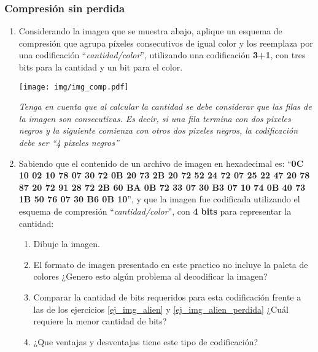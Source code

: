 \documentclass[12pt]{article}
\begin{document}
\subsubsection*{Compresión sin perdida}

\begin{enumerate}[resume]
    \item Considerando la imagen que se muestra abajo, aplique un esquema de
        compresión que agrupa píxeles consecutivos de igual color y los
        reemplaza por una codificación ``\emph{cantidad/color}'', utilizando
        una codificación \textbf{3+1}, con tres bits para la cantidad y un bit
        para el color.

        \texttt{[image: img/img\_comp.pdf]}

        \textit{Tenga en cuenta que al calcular la cantidad se debe considerar
        que las filas de la imagen son consecutivas. Es decir, si una fila
        termina con dos pixeles negros y la siguiente comienza con otros dos
        pixeles negros, la codificación debe ser ``4 pixeles negros''}

    \item Sabiendo que el contenido de un archivo de imagen en hexadecimal es:
        ``\textbf{0C 10 02 10 78 07 30 72 0B 20 73 2B 20 72 52 24 72 07 25
        22 47 20 78 87 20 72 91 28 72 2B 60 BA 0B 72 33 07 30 B3 07 10 74 0B
        40 73 1B 50 76 07 30 B6 0B 10}'', y que la imagen fue codificada
        utilizando el esquema de compresión ``\emph{cantidad/color}'', con
        \textbf{4 bits} para representar la cantidad:

        \begin{enumerate}

            \item Dibuje la imagen.

            \item El formato de imagen presentado en este practico no incluye
                la paleta de colores ¿Genero esto algún problema al
                decodificar la imagen?

            \item Comparar la cantidad de bits requeridos para esta
                codificación frente a las de los ejercicios \ref{ej_img_alien}
                y \ref{ej_img_alien_perdida} ¿Cuál requiere la menor cantidad
                de bits?

            \item ¿Que ventajas y desventajas tiene este tipo de codificación?

        \end{enumerate}
\end{enumerate}
\end{document}
